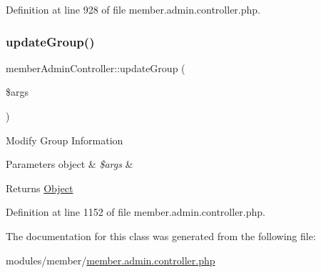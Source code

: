 Definition at line 928 of file member.\+admin.\+controller.\+php.

\mbox{\label{classmemberAdminController_a7a0ee41a6c2feb436959ab1fcfbb0c7c}} 
\subsubsection{\texorpdfstring{update\+Group()}{updateGroup()}}
{\footnotesize\ttfamily member\+Admin\+Controller\+::update\+Group (\begin{DoxyParamCaption}\item[{}]{\$args }\end{DoxyParamCaption})}

Modify Group Information 
\begin{DoxyParams}[1]{Parameters}
object & {\em \$args} & \\
\hline
\end{DoxyParams}
\begin{DoxyReturn}{Returns}
\hyperlink{classObject}{Object} 
\end{DoxyReturn}


Definition at line 1152 of file member.\+admin.\+controller.\+php.



The documentation for this class was generated from the following file\+:\begin{DoxyCompactItemize}
\item 
modules/member/\hyperlink{member_8admin_8controller_8php}{member.\+admin.\+controller.\+php}\end{DoxyCompactItemize}
